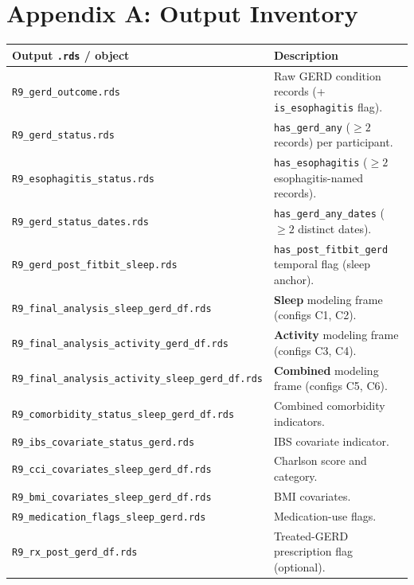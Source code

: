 \documentclass[11pt]{article}
\newcommand{\code}[1]{\texttt{\small #1}}
\begin{document}
\section{Appendix A: Output Inventory}
\begin{longtable}{@{}p{6.6cm}p{6.8cm}@{}}
\toprule
\textbf{Output \code{.rds} / object} & \textbf{Description} \\
\midrule
\endhead
\code{R9_gerd_outcome.rds} & Raw GERD condition records (+ \code{is_esophagitis} flag). \\
\code{R9_gerd_status.rds} & \code{has_gerd_any} ($\geq 2$ records) per participant. \\
\code{R9_esophagitis_status.rds} & \code{has_esophagitis} ($\geq 2$ esophagitis-named records). \\
\code{R9_gerd_status_dates.rds} & \code{has_gerd_any_dates} ($\geq 2$ distinct dates). \\
\code{R9_gerd_post_fitbit_sleep.rds} & \code{has_post_fitbit_gerd} temporal flag (sleep anchor). \\
\code{R9_final_analysis_sleep_gerd_df.rds} & \textbf{Sleep} modeling frame (configs C1, C2). \\
\code{R9_final_analysis_activity_gerd_df.rds} & \textbf{Activity} modeling frame (configs C3, C4). \\
\code{R9_final_analysis_activity_sleep_gerd_df.rds} & \textbf{Combined} modeling frame (configs C5, C6). \\
\code{R9_comorbidity_status_sleep_gerd_df.rds} & Combined comorbidity indicators. \\
\code{R9_ibs_covariate_status_gerd.rds} & IBS covariate indicator. \\
\code{R9_cci_covariates_sleep_gerd_df.rds} & Charlson score and category. \\
\code{R9_bmi_covariates_sleep_gerd_df.rds} & BMI covariates. \\
\code{R9_medication_flags_sleep_gerd.rds} & Medication-use flags. \\
\code{R9_rx_post_gerd_df.rds} & Treated-GERD prescription flag (optional). \\
\bottomrule
\end{longtable}

\end{document}
